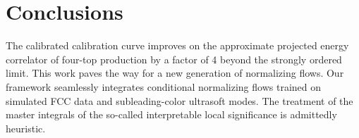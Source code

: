 \section{Conclusions}\label{sec:conclusions}

The calibrated calibration curve improves on the approximate projected
energy correlator of four-top production by a factor of 4 beyond the
strongly ordered limit. This work paves the way for a new generation of
normalizing flows. Our framework seamlessly integrates conditional
normalizing flows trained on simulated FCC data and subleading-color
ultrasoft modes. The treatment of the master integrals of the so-called
interpretable local significance is admittedly heuristic.

